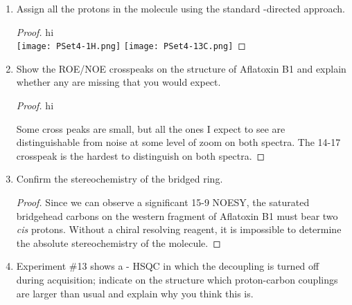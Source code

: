 \documentclass[../psets.tex]{subfiles}
\begin{document}
\begin{enumerate}
    \item Assign all the protons in the molecule using the standard -directed approach.
    \begin{proof}
        {\color{white}hi}\\[1em]
        \texttt{[image: PSet4-1H.png]}
        \texttt{[image: PSet4-13C.png]}
    \end{proof}
    \item Show the ROE/NOE crosspeaks on the structure of Aflatoxin B1 and explain whether any are missing that you would expect.
    \begin{proof}
        {\color{white}hi}
        \begin{center}
            \footnotesize
        \end{center}
        Some cross peaks are small, but all the ones I expect to see are distinguishable from noise at some level of zoom on both spectra. The 14-17 crosspeak is the hardest to distinguish on both spectra.
    \end{proof}
    \item Confirm the stereochemistry of the bridged ring.
    \begin{proof}
        Since we can observe a significant 15-9 NOESY, the saturated bridgehead carbons on the western fragment of Aflatoxin B1 must bear two \emph{cis} protons. Without a chiral resolving reagent, it is impossible to determine the absolute stereochemistry of the molecule.
    \end{proof}
    \item Experiment \#13 shows a - HSQC in which the decoupling is turned off during acquisition; indicate on the structure which proton-carbon couplings are larger than usual and explain why you think this is.

\end{enumerate}
\end{document}
